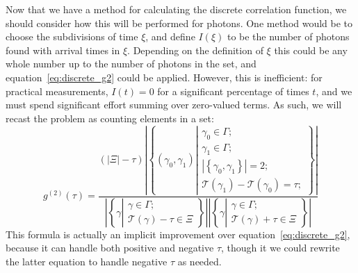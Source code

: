 \documentclass{article}
\newcommand{\braces}[1]{\ensuremath{\left\lbrace #1 \right\rbrace}}
\newcommand{\parens}[1]{\ensuremath{\left( #1 \right)}}
\newcommand{\setbuilder}[2]{\ensuremath{\braces{#1 \left| #2 \right.}}}
\newcommand{\gn}[1]{\ensuremath{g^{(#1)}}}
\newcommand{\abs}[1]{\ensuremath{\left|#1\right|}}
\newcommand{\Time}{\ensuremath{\mathcal{T}}}
\newcommand{\photon}{\ensuremath{\gamma}}
\newcommand{\photons}{\ensuremath{\Gamma}}
\newcommand{\integrationtime}{\ensuremath{\Xi}}
\newcommand{\timewindow}{\ensuremath{\xi}}
\begin{document}
Now that we have a method for calculating the discrete correlation function, we should consider how this will be performed for photons. One method would be to choose the subdivisions of time $\timewindow$, and define $I(\timewindow)$ to be the number of photons found with arrival times in $\timewindow$. Depending on the definition of $\timewindow$ this could be any whole number up to the number of photons in the set, and equation~\ref{eq:discrete_g2} could be applied. However, this is inefficient: for practical measurements, $I(t)=0$ for a significant percentage of times $t$, and we must spend significant effort summing over zero-valued terms. As such, we will recast the problem as counting elements in a set:
\begin{equation}
\label{eq:photon_g2}
\gn{2}(\tau) = \frac{\parens{\abs{\integrationtime}-\tau}
                     \abs{\setbuilder{(\photon_{0},\photon_{1})}
                                     {\begin{aligned}
                                      \photon_{0}\in\photons;\\
                                      \photon_{1}\in\photons;\\
                                      \abs{\braces{\photon_{0},\photon_{1}}}=2;\\
                                      \Time(\photon_{1})-\Time(\photon_{0})=\tau;
                                      \end{aligned}}}}
                    {
                             \abs{\setbuilder{\photon}{\begin{aligned}
                                                      \photon\in\photons;\\
                                                      \Time(\photon)-\tau\in\integrationtime
                                                      \end{aligned}}}
                             \abs{\setbuilder{\photon}{\begin{aligned}
                                                      \photon\in\photons;\\
                                                      \Time(\photon)+\tau\in\integrationtime
                                                      \end{aligned}}}}
\end{equation} 
This formula is actually an implicit improvement over equation~\ref{eq:discrete_g2}, because it can handle both positive and negative $\tau$, though it we could rewrite the latter equation to handle negative $\tau$ as needed.
\end{document}
